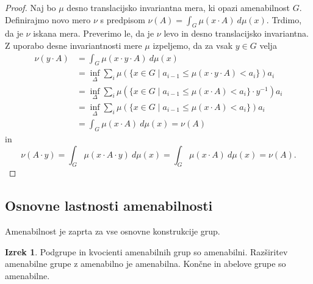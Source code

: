 \documentclass[11pt]{book}
\theoremstyle{definition}
\theoremstyle{zgled}
\theoremstyle{odprtproblem}
\theoremstyle{domacanaloga}
\newenvironment{dokaz}
    {\color{siva}\begin{proof}}
    {\end{proof}}
\theoremstyle{izrek}
\newtheorem*{izrek}{Izrek}
\begin{document}
\begin{dokaz}
Naj bo $\mu$ desno translacijsko invariantna mera, ki opazi amenabilnost $G$. Definirajmo novo mero $\nu$ s predpisom $\nu(A) = \int_G \mu(x \cdot A) \ d\mu(x)$. Trdimo, da je $\nu$ iskana mera. Preverimo le, da je $\nu$ levo in desno translacijsko invariantna. Z uporabo desne invariantnosti mere $\mu$ izpeljemo, da za vsak $y \in G$ velja
\begin{align*}
\nu(y \cdot A) &= \int_G \mu(x \cdot y \cdot A) \ d \mu(x) \\
&= \inf_\Delta \sum_i \mu(\{ x \in G \mid a_{i-1} \leq \mu(x \cdot y \cdot A) < a_i \}) a_i \\
&= \inf_\Delta \sum_i \mu(\{ x \in G \mid a_{i-1} \leq \mu(x \cdot A) < a_i \} \cdot y^{-1}) a_i \\
&= \inf_\Delta \sum_i \mu(\{ x \in G \mid a_{i-1} \leq \mu(x \cdot A) < a_i \}) a_i \\
&= \int_G \mu(x\cdot A) \ d \mu(x) = \nu(A)
\end{align*}
in 
\[
\nu(A \cdot y) = \int_G \mu(x \cdot A \cdot y) \ d \mu(x) = \int_G \mu(x \cdot A) \ d\mu(x) = \nu(A).
\]
\end{dokaz}

\subsection{Osnovne lastnosti amenabilnosti}

Amenabilnost je zaprta za vse osnovne konstrukcije grup.

\begin{izrek}
Podgrupe in kvocienti amenabilnih grup so amenabilni. Razširitev amenabilne grupe z amenabilno je amenabilna. Končne in abelove grupe so amenabilne. 
\end{izrek}
\end{document}
